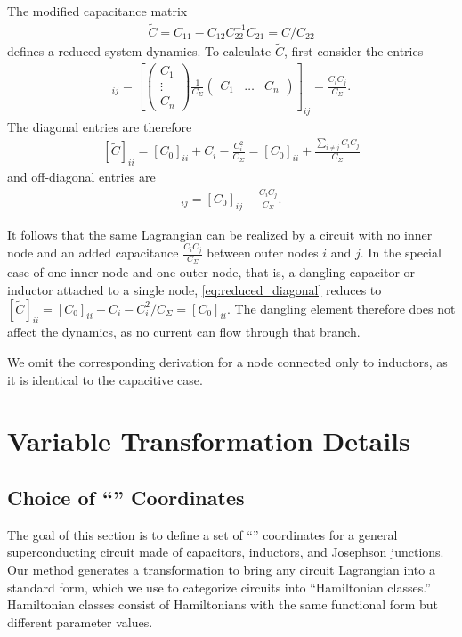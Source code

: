 The modified capacitance matrix
\begin{align}
    \tilde{C} = C_{11} - C_{12}C_{22}^{-1}C_{21} = C/C_{22}
\end{align}
defines a reduced system dynamics. To calculate $\tilde{C}$, first consider the entries
\begin{align*}
    [C/C_{22}]_{ij} = [\begin{pmatrix}
        C_1 \\
        \vdots \\
        C_n
    \end{pmatrix} \frac{1}{C_\Sigma}\begin{pmatrix}
        C_1 & \dots & C_n
    \end{pmatrix}]_{ij} = \frac{C_iC_j}{C_\Sigma}.
\end{align*}
The diagonal entries are therefore
\begin{align}\label{eq:reduced_diagonal}
    [\tilde{C}]_{ii} = [C_0]_{ii} + C_i - \frac{C_i^2}{C_\Sigma} = [C_0]_{ii} + \frac{\sum_{i\neq j} C_iC_j}{C_\Sigma}
\end{align}
and off-diagonal entries are
\begin{align}
    [\tilde{C}]_{ij} = [C_0]_{ij} - \frac{C_iC_j}{C_\Sigma}.
\end{align}

It follows that the same Lagrangian can be realized by a circuit with no inner node and an added capacitance $\frac{C_iC_j}{C_\Sigma}$ between outer nodes $i$ and $j$. In the special case of one inner node and one outer node, that is, a dangling capacitor or inductor attached to a single node, \cref{eq:reduced_diagonal} reduces to
$[\tilde{C}]_{ii} = [C_0]_{ii} + C_i - C_i^2/C_\Sigma = [C_0]_{ii}$. The dangling element therefore does not affect the dynamics, as no current can flow through that branch.

We omit the corresponding derivation for a node connected only to inductors, as it is identical to the capacitive case.


\section{Variable Transformation Details}\label{app:var_trans}
\subsection{Choice of ``\Canonical'' Coordinates}
The goal of this section is to define a set of ``\canonical'' coordinates for a general superconducting circuit made of capacitors, inductors, and Josephson junctions. Our method generates a transformation to bring any circuit Lagrangian into a standard form, which we use to categorize circuits into ``Hamiltonian classes.'' 
Hamiltonian classes consist of Hamiltonians with the same functional form but different parameter values. 

